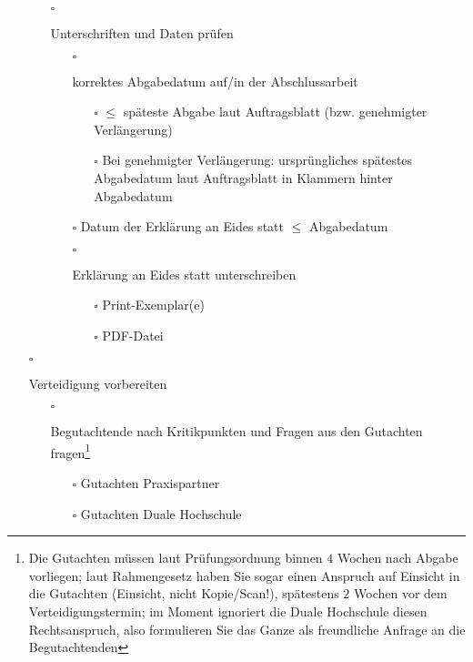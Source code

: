 \begin{itemize}
{\begin{itemize}
{            }
            \item[$\square$]{
                Unterschriften und Daten prüfen
                \begin{itemize}
                    \item[$\square$]{
                        korrektes Abgabedatum auf/in der Abschlussarbeit
                        \begin{itemize}
                            \item[$\square$] $\leq$ späteste Abgabe laut Auftragsblatt (bzw. genehmigter Verlängerung)
                            \item[$\square$] Bei genehmigter Verlängerung: ursprüngliches spätestes Abgabedatum laut Auftragsblatt in Klammern hinter Abgabedatum
                        \end{itemize}
                    }
                    \item[$\square$] Datum der Erklärung an Eides statt $\leq$ Abgabedatum
                    \item[$\square$]{
                        Erklärung an Eides statt unterschreiben
                        \begin{itemize}
                            \item[$\square$] Print-Exemplar(e)
                            \item[$\square$] PDF-Datei
                        \end{itemize}
                    }
                \end{itemize}
            }
        \end{itemize}
    }
    \item[$\square$]{
        Verteidigung vorbereiten
        \begin{itemize}
            \item[$\square$]{
                Begutachtende nach Kritikpunkten und Fragen aus den Gutachten fragen\footnote{Die Gutachten müssen laut Prüfungsordnung binnen $4$ Wochen nach Abgabe vorliegen; laut Rahmengesetz haben Sie sogar einen Anspruch auf Einsicht in die Gutachten (Einsicht, nicht Kopie/Scan!), spätestens $2$ Wochen vor dem Verteidigungstermin; im Moment ignoriert die Duale Hochschule diesen Rechtsanspruch, also formulieren Sie das Ganze als freundliche Anfrage an die Begutachtenden}
                \begin{itemize}
                    \item[$\square$] Gutachten Praxispartner
                    \item[$\square$] Gutachten Duale Hochschule

\end{itemize}}
\end{itemize}}
\end{itemize}
